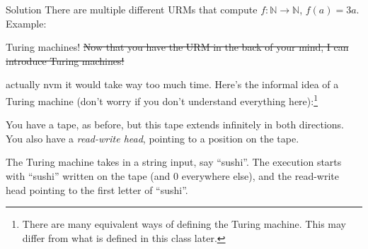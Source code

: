 \documentclass{beamer}
\begin{document}
\begin{frame}{Solution}
There are multiple different URMs that compute $f: \mathbb N \to \mathbb N$, $f(a) = 3a$. Example:
\begin{center}
\begin{algorithmic}[1]
\end{algorithmic}
\end{center}
\end{frame}

\begin{frame}{Turing machines!}
\sout{Now that you have the URM in the back of your mind, I can introduce Turing machines!}

actually nvm it would take way too much time. Here's the informal idea of a Turing machine (don't worry if you don't understand everything here):\footnote{There are many equivalent ways of defining the Turing machine. This may differ from what is defined in this class later.}

You have a tape, as before, but this tape extends infinitely in both directions.
You also have a \textit{read-write head}, pointing to a position on the tape.

The Turing machine takes in a string input, say ``sushi''. The execution starts with ``sushi'' written on the tape (and $0$ everywhere else), and the read-write head pointing to the first letter of ``sushi''.

\begin{center}
\end{center}


\end{frame}
\end{document}

